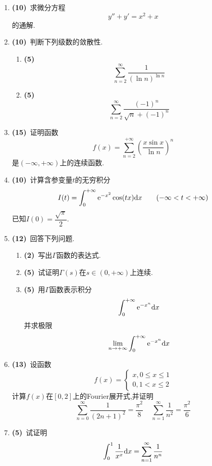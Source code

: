 \documentclass{ctexart}
\begin{document}
\begin{enumerate}[leftmargin=*,label=\textbf{\arabic*.},topsep=0pt,parsep=0pt,itemsep=0pt,partopsep=0pt]
\begin{enumerate}[label=\tbf{(\arabic*)},topsep=0pt,parsep=0pt,itemsep=0pt,partopsep=0pt]
        \end{enumerate}

    \item \textbf{(10)}\ 求微分方程
        \[y''+y'=x^2+x\]
        的通解.

    \item \textbf{(10)}\ 判断下列级数的敛散性.
        \begin{enumerate}[label=\tbf{(\arabic*)},topsep=0pt,parsep=0pt,itemsep=0pt,partopsep=0pt]
            \item \textbf{(5)}
                \[\sum_{n=2}^{\infty}\dfrac{1}{(\ln n)^{\ln n}}\]
            \item \textbf{(5)}
                \[\sum_{n=2}^{\infty}\dfrac{(-1)^n}{\sqrt{n}+(-1)^n}\]

        \end{enumerate}

    \item \textbf{(15)}\ 证明函数
        \[f(x)=\sum_{n=2}^{+\infty}\left(\dfrac{x\sin x}{\ln n}\right)^n\]
        是$(-\infty,+\infty)$上的连续函数.

    \item \textbf{(10)}\ 计算含参变量$t$的无穷积分
        \[I(t)=\int_0^{+\infty}\mathrm{e}^{-x^2}\cos(tx)\mathrm{d} x\qquad(-\infty<t<+\infty)\]
        已知$I(0)=\dfrac{\sqrt{\pi}}{2}$.

    \item \textbf{(12)}\ 回答下列问题.
        \begin{enumerate}[label=\tbf{(\arabic*)},topsep=0pt,parsep=0pt,itemsep=0pt,partopsep=0pt]
            \item \textbf{(2)}\ 写出$\Gamma$函数的表达式.
            \item \textbf{(5)}\ 试证明$\Gamma(s)$在$s\in(0,+\infty)$上连续.
            \item \textbf{(5)}\ 用$\Gamma$函数表示积分
                \[\int_0^{+\infty}\mathrm{e}^{-x^n}\mathrm{d} x\]
                并求极限
                \[\lim_{n\to+\infty}\int_0^{+\infty}\mathrm{e}^{-x^n}\mathrm{d} x\]

        \end{enumerate}

    \item \textbf{(13)}\ 设函数
        \[f(x)=\left\{\begin{array}{l}
            x,0\leqslant x\leqslant 1\\
            0,1<x\leqslant 2
        \end{array}\right.\]
        计算$f(x)$在$[0,2]$上的Fourier展开式,并证明
        \[\sum_{n=0}^{\infty}\dfrac{1}{(2n+1)^2}=\dfrac{\pi^2}{8}\ \ \ \ \ \sum_{n=1}^{\infty}\dfrac{1}{n^2}=\dfrac{\pi^2}{6}\]

    \item \textbf{(5)}\ 试证明
        \[\int_0^1\dfrac{1}{x^x}\mathrm{d} x=\sum_{n=1}^{\infty}\dfrac{1}{n^n}\]

\end{enumerate}
\end{document}
